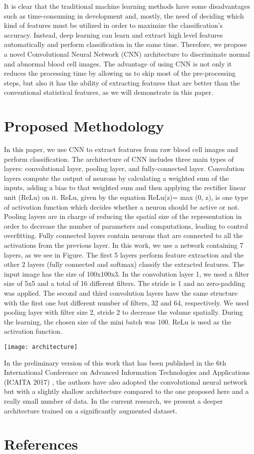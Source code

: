 \documentclass[review]{elsarticle}
\begin{document}
It is clear that the traditional machine learning methods have some disadvantages such as time-consuming in development and, mostly, the need of deciding which kind of features must be utilized in order to maximize the classification’s accuracy. Instead, deep learning can learn and extract high level features automatically and perform classification in the same time. Therefore, we propose a novel Convolutional Neural Network (CNN) architecture to discriminate normal and abnormal blood cell images. The advantage of using CNN is not only it reduces the processing time by allowing us to skip most of the pre-processing steps, but also it has the ability of extracting features that are better than the conventional statistical features, as we will demonstrate in this paper.

\section*{Proposed Methodology}

In this paper, we use CNN to extract features from raw blood cell images and perform classification. The architecture of CNN includes three main types of layers: convolutional layer, pooling layer, and fully-connected layer. Convolution layers compute the output of neurons by calculating a weighted sum of the inputs, adding a bias to that weighted sum and then applying the rectifier linear unit (ReLu) on it. ReLu, given by the equation ReLu(z)= max (0, z), is one type of activation function which decides whether a neuron should be active or not. Pooling layers are in charge of reducing the spatial size of the representation in order to decrease the number of parameters and computations, leading to control overfitting. Fully connected layers contain neurons that are connected to all the activations from the previous layer. In this work, we use a network containing 7 layers, as we see in Figure. The first 5 layers perform feature extraction and the other 2 layers (fully connected and softmax) classify the extracted features. The input image has the size of 100x100x3. In the convolution layer 1, we used a filter size of 5x5 and a total of 16 different filters. The stride is 1 and no zero-padding was applied. The second and third convolution layers have the same structure with the first one but different number of filters, 32 and 64, respectively. We used pooling layer with filter size 2, stride 2 to decrease the volume spatially. During the learning, the chosen size of the mini batch was 100. ReLu is used as the activation function. 
\begin{center}
\texttt{[image: architecture]}
\end{center}
In the preliminary version of this work that has been published in the 6th International Conference on Advanced Information Technologies and Applications (ICAITA 2017) \citep{PM1}, the authors have also adopted the convolutional neural network but with a slightly shallow architecture compared to the one proposed here and a really small number of data. In the current research, we present a deeper architecture trained on a significantly augmented dataset.
\bigbreak
\bigbreak
\bigbreak
\section*{References}


\end{document}
